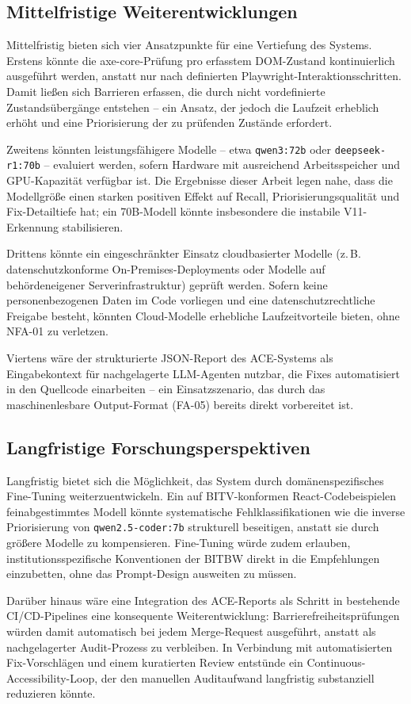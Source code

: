 \subsection{Mittelfristige Weiterentwicklungen}
\label{sec:ausblick_mittel}

Mittelfristig bieten sich vier Ansatzpunkte für eine Vertiefung des Systems. Erstens könnte die axe-core-Prüfung pro erfasstem \ac{DOM}-Zustand kontinuierlich ausgeführt werden, anstatt nur nach definierten Playwright-Interaktionsschritten. Damit ließen sich Barrieren erfassen, die durch nicht vordefinierte Zustandsübergänge entstehen -- ein Ansatz, der jedoch die Laufzeit erheblich erhöht und eine Priorisierung der zu prüfenden Zustände erfordert.

Zweitens könnten leistungsfähigere Modelle -- etwa \texttt{qwen3:72b} oder \texttt{deepseek-r1:70b} -- evaluiert werden, sofern Hardware mit ausreichend Arbeitsspeicher und \ac{GPU}-Kapazität verfügbar ist. Die Ergebnisse dieser Arbeit legen nahe, dass die Modellgröße einen starken positiven Effekt auf Recall, Priorisierungsqualität und Fix-Detailtiefe hat; ein 70B-Modell könnte insbesondere die instabile V11-Erkennung stabilisieren.

Drittens könnte ein eingeschränkter Einsatz cloudbasierter Modelle (z.\,B. datenschutzkonforme On-Premises-Deployments oder Modelle auf behördeneigener Serverinfrastruktur) geprüft werden. Sofern keine personenbezogenen Daten im Code vorliegen und eine datenschutzrechtliche Freigabe besteht, könnten Cloud-Modelle erhebliche Laufzeitvorteile bieten, ohne \ac{NFA}-01 zu verletzen.

Viertens wäre der strukturierte \acs{JSON}-Report des \ac{ACE}-Systems als Eingabekontext für nachgelagerte \ac{LLM}-Agenten nutzbar, die Fixes automatisiert in den Quellcode einarbeiten -- ein Einsatzszenario, das durch das maschinenlesbare Output-Format (\ac{FA}-05) bereits direkt vorbereitet ist.

\subsection{Langfristige Forschungsperspektiven}
\label{sec:ausblick_lang}

Langfristig bietet sich die Möglichkeit, das System durch domänenspezifisches Fine-Tuning weiterzuentwickeln. Ein auf \ac{BITV}-konformen React-Codebeispielen feinabgestimmtes Modell könnte systematische Fehlklassifikationen wie die inverse Priorisierung von \texttt{qwen2.5-coder:7b} strukturell beseitigen, anstatt sie durch größere Modelle zu kompensieren. Fine-Tuning würde zudem erlauben, institutionsspezifische Konventionen der \ac{BITBW} direkt in die Empfehlungen einzubetten, ohne das Prompt-Design ausweiten zu müssen.

Darüber hinaus wäre eine Integration des \ac{ACE}-Reports als Schritt in bestehende CI/CD-Pipelines eine konsequente Weiterentwicklung: Barrierefreiheitsprüfungen würden damit automatisch bei jedem Merge-Request ausgeführt, anstatt als nachgelagerter Audit-Prozess zu verbleiben. In Verbindung mit automatisierten Fix-Vorschlägen und einem kuratierten Review entstünde ein Continuous-Accessibility-Loop, der den manuellen Auditaufwand langfristig substanziell reduzieren könnte.
